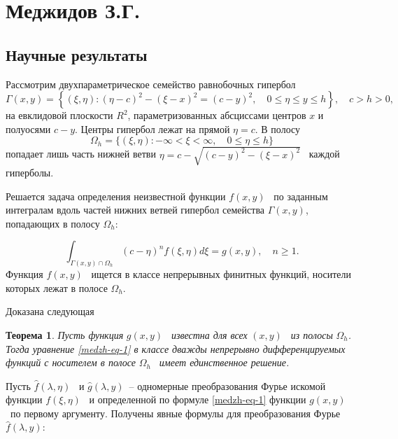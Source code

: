 \chapter{Меджидов З.Г.}

\section{Научные результаты}

Рассмотрим двухпараметрическое семейство равнобочных гипербол
\begin{equation*}
\Gamma \left(x,y\right)=\left\{\left(\xi ,\eta \right):\left(\eta -c\right)^2-(\xi -x)^2=(c-y)^2,\quad 0{\leq}\eta
{\leq}y{\leq}h\right\},\quad c>h>0,
\end{equation*}
на евклидовой плоскости  $R^2$, параметризованных абсциссами центров  $x$ и полуосями  $c-y$. Центры гипербол лежат на
прямой  $\eta =c$. В полосу
\begin{equation*}
\Omega _h=\{\left(\xi ,\eta \right):-{\infty}<\xi <{\infty},\quad 0{\leq}\eta {\leq}h\}
\end{equation*}
попадает лишь часть нижней ветви  $\eta =c-\sqrt{\left(c-y\right)^2-\left(\xi -x\right)^2}$ \ каждой гиперболы.

Решается задача определения неизвестной функции  $f(x,y)$ \ по заданным интегралам вдоль частей нижних ветвей гипербол
семейства  $\Gamma \left(x,y\right)$, попадающих в полосу  $\Omega _h$:

\begin{equation}\label{medzh-eq-1}
\int _{\Gamma \left(x,y\right){\cap}\Omega _h}^{}\left(c-\eta \right)^nf\left(\xi ,\eta \right)\mathit{d\xi
}=g\left(x,y\right),\quad n{\geq}1.
\end{equation}
Функция  $f(x,y)$ \ ищется в классе непрерывных финитных функций, носители которых лежат в полосе  $\Omega _h$.

Доказана следующая

\textbf{Теорема 1}. \textit{Пусть функция } $g\left(x,y\right)$ \textit{\ известна для всех } $\left(x,y\right)$
\textit{\ из полосы } $\Omega _h$\textit{. Тогда уравнение \eqref{medzh-eq-1} в классе дважды непрерывно дифференцируемых функций с
	носителем в полосе } $\Omega _h$ \textit{\ имеет единственное решение.}

Пусть  $\widehat  f(\lambda ,\eta )$ \ и  $\widehat  g\left(\lambda ,y\right)$\ – одномерные преобразования Фурье
искомой функции  $f(\xi ,\eta )$ \ и определенной по формуле \eqref{medzh-eq-1} функции  $g(x,y)$ \ по первому аргументу. Получены
явные формулы для преобразования Фурье  $\widehat  f\left(\lambda ,y\right)$:


